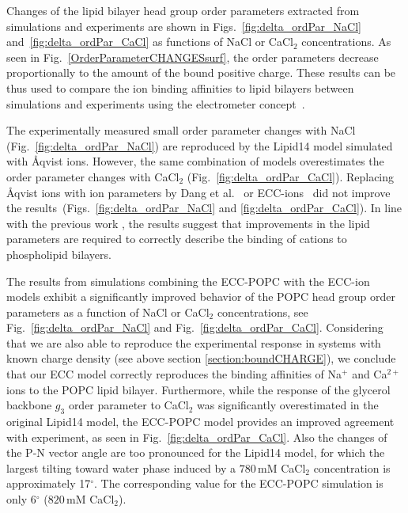 \documentclass[journal=jpcbfk,manuscript=article]{achemso}
\begin{document}
Changes of the lipid bilayer head group order parameters extracted from simulations and
experiments \cite{akutsu81, altenbach84} are shown in Figs.~\ref{fig:delta_ordPar_NaCl}
and~\ref{fig:delta_ordPar_CaCl} as functions of NaCl or CaCl$_2$ concentrations.
As seen in Fig.~\ref{OrderParameterCHANGESsurf}, the order parameters decrease
proportionally to the amount of the bound positive charge.
These results can be thus used to compare the ion binding affinities to lipid bilayers between
simulations and experiments using the electrometer concept~\cite{seelig87, catte16}.

The experimentally measured small order parameter
changes with NaCl (Fig.~\ref{fig:delta_ordPar_NaCl}) 
are reproduced by the Lipid14 model simulated with \AA{}qvist ions.
However, the same combination of models overestimates the order parameter changes with CaCl$_2$ (Fig.~\ref{fig:delta_ordPar_CaCl}).
Replacing \AA{}qvist ions with ion parameters by Dang et al.~\cite{smith94, chang1999, dang2006}
or ECC-ions~\cite{martinek17, kohagen16, Pluharova2014} did not improve
the results~(Figs.~\ref{fig:delta_ordPar_NaCl} and \ref{fig:delta_ordPar_CaCl}).
In line with the previous work \cite{catte16}, the results suggest that improvements
in the lipid parameters are required to correctly describe the binding of cations to phospholipid bilayers.

The results from simulations combining the ECC-POPC with the ECC-ion models \cite{martinek17, kohagen16, Pluharova2014} exhibit a significantly improved behavior of the POPC head group order parameters as a function of NaCl or CaCl$_2$ concentrations, see Fig.~\ref{fig:delta_ordPar_NaCl} and Fig.~\ref{fig:delta_ordPar_CaCl}. Considering that we are also able to reproduce the experimental response in systems with known charge density (see above section \ref{section:boundCHARGE}), we conclude that our ECC model correctly reproduces the binding affinities of Na$^{+}$ and Ca$^{2+}$ ions to the POPC lipid bilayer. Furthermore, while the response of the glycerol backbone $g_3$ order parameter to CaCl$_2$ was significantly overestimated in the original Lipid14 model, the ECC-POPC model provides an improved agreement with experiment, as seen in Fig.~\ref{fig:delta_ordPar_CaCl}.
Also the changes of the P-N vector angle are too pronounced for the Lipid14 model,
for which the largest tilting toward water phase induced by a $780\,\mathrm{mM}$
CaCl$_2$ concentration is approximately 17$^{\circ}$. The corresponding value
for the ECC-POPC simulation is only 6$^{\circ}$ ($820\,\mathrm{mM}$ CaCl$_2$). 
\end{document}
